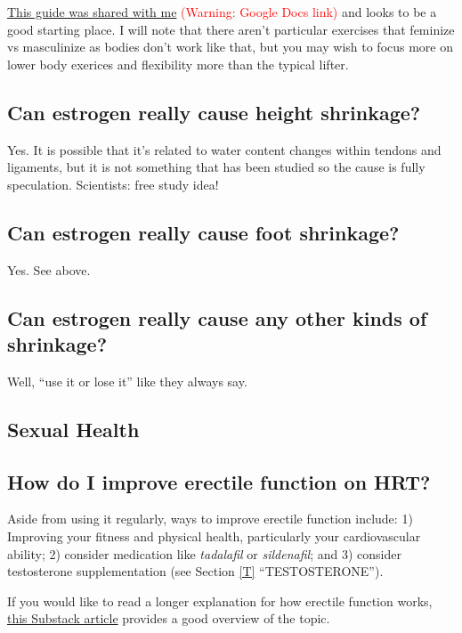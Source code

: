 \documentclass{article}
\begin{document}
\href{https://docs.google.com/document/d/1-NyE5EY5TTaRRMhk7HlTbKJ7HifjEsA4jlDO1qKQVl0/edit?tab=t.0}{This guide was shared with me} \textcolor{red}{(Warning: Google Docs link)} and looks to be a good starting place. I will note that there aren't particular exercises that feminize vs masculinize as bodies don't work like that, but you may wish to focus more on lower body exerices and flexibility more than the typical lifter.

\subsection{Can estrogen really cause height shrinkage?}

Yes. It is possible that it’s related to water content changes within tendons and ligaments, but it is not something that has been studied so the cause is fully speculation. Scientists: free study idea!

\subsection{Can estrogen really cause foot shrinkage?}

Yes. See above.

\subsection{Can estrogen really cause any other kinds of shrinkage?}

Well, “use it or lose it” like they always say.

\subsection*{Sexual Health}

\subsection{How do I improve erectile function on HRT?}\label{11-20}

Aside from using it regularly, ways to improve erectile function include: 1) Improving your fitness and physical health, particularly your cardiovascular ability; 2) consider medication like \textit{tadalafil} or \textit{sildenafil}; and 3) consider testosterone supplementation (see Section \ref{T} “TESTOSTERONE”).

If you would like to read a longer explanation for how erectile function works, \href{https://stainedglasswoman.substack.com/p/how-to-maintain-your-penis-function}{this Substack article} provides a good overview of the topic.
\end{document}
